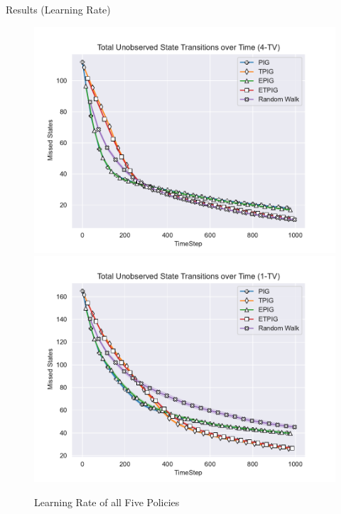 	\begin{frame}[fragile]{Results (Learning Rate)}
		\begin{figure}
			\begin{center}
				\includegraphics[scale=0.40]{"../images/Missed_States_4-TV.pdf"}
				\includegraphics[scale=0.40]{"../images/Missed_States_1-TV.pdf"}
			\end{center}
			\caption{Learning Rate of all Five Policies}
		\end{figure}
	\end{frame}
	
	
